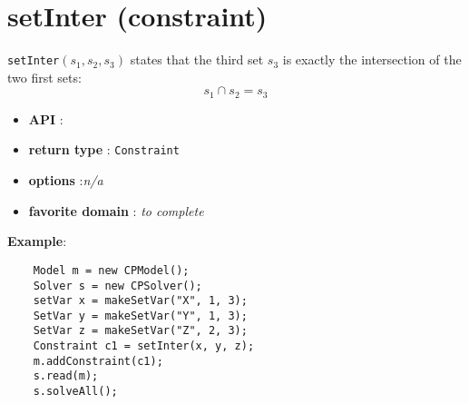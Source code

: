 \label{setinter}
\hypertarget{setinter}{}

\section{setInter (constraint)}\label{setinter:setinterconstraint}\hypertarget{setinter:setinterconstraint}{}
\begin{notedef}
  \texttt{setInter}$(s_1,s_2,s_3)$ states that the third set $s_3$ is exactly the intersection of the two first sets:
$$s_1\cap s_2=s_3$$
\end{notedef}

\begin{itemize}
	\item \textbf{API} : 
	\item \textbf{return type} : \texttt{Constraint}
	\item \textbf{options} :\emph{n/a}
	\item \textbf{favorite domain} : \emph{to complete}
\end{itemize}

\textbf{Example}:
\begin{lstlisting}
	Model m = new CPModel();
	Solver s = new CPSolver();
	setVar x = makeSetVar("X", 1, 3);
	SetVar y = makeSetVar("Y", 1, 3);
	SetVar z = makeSetVar("Z", 2, 3);
	Constraint c1 = setInter(x, y, z);
	m.addConstraint(c1);
	s.read(m);
	s.solveAll();
\end{lstlisting} 
